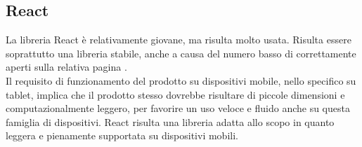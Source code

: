 \subsection{React}

La libreria React è relativamente giovane, ma risulta molto usata. Risulta essere soprattutto una libreria stabile, anche a causa del numero basso di  correttamente aperti sulla relativa pagina .
\\Il requisito di funzionamento del prodotto su dispositivi mobile, nello specifico su tablet, implica che il prodotto stesso dovrebbe risultare di piccole dimensioni e computazionalmente leggero, per favorire un uso veloce e fluido anche su questa famiglia di dispositivi. React risulta una libreria adatta allo scopo in quanto leggera e pienamente supportata su dispositivi mobili. 